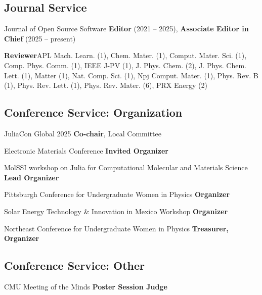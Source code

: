 \subsection{Journal Service}

{Journal of Open Source Software}
{\textbf{Editor} (2021 -- 2025), \textbf{Associate Editor in Chief} (2025 -- present)}
{}

{}
                     {\textbf{Reviewer}}{APL Mach. Learn. (1), Chem. Mater. (1), Comput. Mater. Sci. (1), Comp. Phys. Comm. (1), IEEE J-PV (1), J. Phys. Chem. (2),  J. Phys. Chem. Lett. (1), Matter (1), Nat. Comp. Sci. (1), Npj Comput. Mater. (1), Phys. Rev. B (1), Phys. Rev. Lett. (1), Phys. Rev.  Mater. (6), PRX Energy (2)}

\vspace{-3mm}
\subsection{Conference Service: Organization}
                      {JuliaCon Global 2025}
                      {\textbf{Co-chair}, Local Committee}
                        {}

{Electronic Materials Conference}
{\textbf{Invited Organizer}}
{}

{MolSSI workshop on Julia for Computational Molecular and Materials Science}
{\textbf{Lead Organizer}}
{}

{Pittsburgh Conference for Undergraduate Women in Physics}
{\textbf{Organizer}}
{}

{Solar Energy Technology \& Innovation in Mexico Workshop}
{\textbf{Organizer}}
{}

{Northeast Conference for Undergraduate Women in Physics}
{\textbf{Treasurer, Organizer}}
{}

\vspace{-2mm}
\subsection{Conference Service: Other}

{CMU Meeting of the Minds}
{\textbf{Poster Session Judge}}
{}


